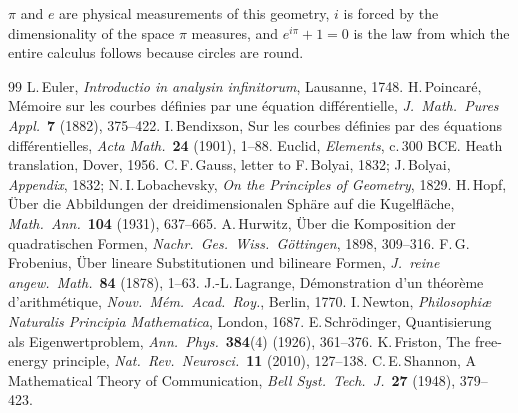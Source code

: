 \documentclass[12pt]{article}
\begin{document}
$\pi$ and $e$ are physical measurements of this geometry, $i$ is forced by the dimensionality of the space $\pi$ measures, and $e^{i\pi} + 1 = 0$ is the law from which the entire calculus follows because circles are round.


\begin{thebibliography}{99}
 L.\,Euler, \emph{Introductio in analysin infinitorum}, Lausanne, 1748.
 H.\,Poincar\'e, M\'emoire sur les courbes d\'efinies par une \'equation diff\'erentielle, \emph{J.\ Math.\ Pures Appl.}\ \textbf{7} (1882), 375--422.
 I.\,Bendixson, Sur les courbes d\'efinies par des \'equations diff\'erentielles, \emph{Acta Math.}\ \textbf{24} (1901), 1--88.
 Euclid, \emph{Elements}, c.\,300 BCE. Heath translation, Dover, 1956.
 C.\,F.\,Gauss, letter to F.\,Bolyai, 1832; J.\,Bolyai, \emph{Appendix}, 1832; N.\,I.\,Lobachevsky, \emph{On the Principles of Geometry}, 1829.
 H.\,Hopf, \"Uber die Abbildungen der dreidimensionalen Sph\"are auf die Kugelfl\"ache, \emph{Math.\ Ann.}\ \textbf{104} (1931), 637--665.
 A.\,Hurwitz, \"Uber die Komposition der quadratischen Formen, \emph{Nachr.\ Ges.\ Wiss.\ G\"ottingen}, 1898, 309--316.
 F.\,G.\,Frobenius, \"Uber lineare Substitutionen und bilineare Formen, \emph{J.\ reine angew.\ Math.}\ \textbf{84} (1878), 1--63.
 J.-L.\,Lagrange, D\'emonstration d'un th\'eor\`eme d'arithm\'etique, \emph{Nouv.\ M\'em.\ Acad.\ Roy.}, Berlin, 1770.
 I.\,Newton, \emph{Philosophi\ae{} Naturalis Principia Mathematica}, London, 1687.
 E.\,Schr\"odinger, Quantisierung als Eigenwertproblem, \emph{Ann.\ Phys.}\ \textbf{384}(4) (1926), 361--376.
 K.\,Friston, The free-energy principle, \emph{Nat.\ Rev.\ Neurosci.}\ \textbf{11} (2010), 127--138.
 C.\,E.\,Shannon, A Mathematical Theory of Communication, \emph{Bell Syst.\ Tech.\ J.}\ \textbf{27} (1948), 379--423.
\end{thebibliography}
\end{document}
